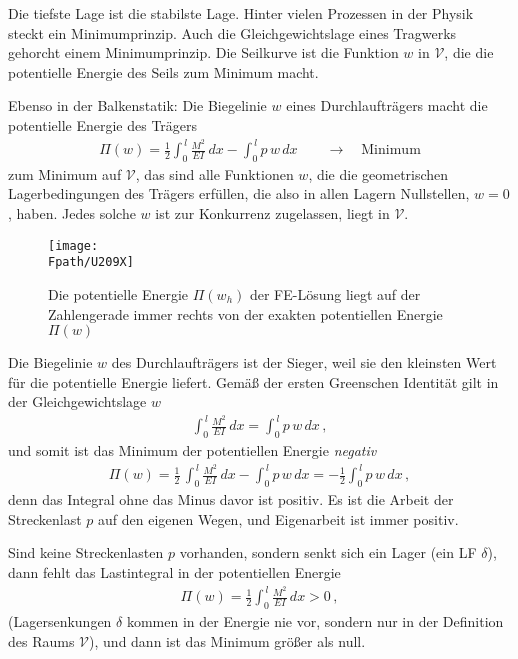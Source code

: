 {{Die tiefste Lage ist die stabilste Lage. Hinter vielen Prozessen in der Physik steckt ein
Minimumprinzip. Auch die Gleichgewichtslage eines Tragwerks gehorcht einem
Minimumprinzip. Die Seilkurve ist die Funktion $w$ in $\mathcal{V}$, die die potentielle Energie des Seils zum Minimum macht.

Ebenso in der Balkenstatik:  Die Biegelinie $w$ eines Durchlauftr\"{a}gers macht die
potentielle Energie des Tr\"{a}gers
\begin{align}
\Pi(w) = \frac{1}{2} \int_0^{\,l} \frac{M^2}{EI} \,dx - \int_0^{\,l} p\, w \, dx \qquad
\rightarrow \quad \mbox{Minimum}
\end{align}
zum Minimum auf $\mathcal{V}$, das sind alle Funktionen $w$, die die
geometrischen Lagerbedingungen des Tr\"{a}gers erf\"{u}llen, die also in allen Lagern
Nullstellen, $w = 0$, haben. Jedes solche $w$ ist zur Konkurrenz zugelassen, liegt in $\mathcal{V}$.
\begin{figure}[tbp] \centering
\if {} \sidecaption \fi
\texttt{[image: \\Fpath/U209X]}
\caption{Die potentielle Energie $\Pi(w_h)$ der FE-L\"{o}sung liegt auf der Zahlengerade
immer rechts von der exakten potentiellen Energie $\Pi(w)$} \label{Energie}
\end{figure}%

Die Biegelinie $w$ des Durchlauftr\"{a}gers ist der Sieger, weil sie den kleinsten Wert f\"{u}r die
potentielle Energie liefert. Gem\"{a}{\ss} der ersten Greenschen Identit\"{a}t gilt in der Gleichgewichtslage $w$
\begin{align}
\int_0^{\,l} \frac{M^2}{EI}\,dx = \int_0^{\,l} p\,w\,dx \,,
\end{align}
und somit ist das Minimum der potentiellen Energie {\em negativ\/}
\begin{align}
\Pi(w) = \frac{1}{2}\,\int_0^{\,l} \frac{M^2}{EI}\,dx - \int_0^{\,l} p\,w\,dx = -
\frac{1}{2} \int_0^{\,l} p \,w \, dx \,,
\end{align}
denn das Integral ohne das Minus davor ist positiv. Es ist die Arbeit der
Streckenlast $p$ auf den eigenen Wegen, und Eigenarbeit ist immer positiv.

Sind keine Streckenlasten $p$ vorhanden, sondern senkt sich ein Lager (ein LF $\delta$), dann fehlt das
Lastintegral in der potentiellen Energie
\begin{align}
 \Pi(w) =
\frac{1}{2} \int_0^{\,l} \frac{M^2}{EI}\, dx > 0 \,,
\end{align}
(Lagersenkungen $\delta $ kommen in der Energie nie vor, sondern nur in der
Definition des Raums $\mathcal{V}$), und dann ist das Minimum gr\"{o}{\ss}er als null.

}}
